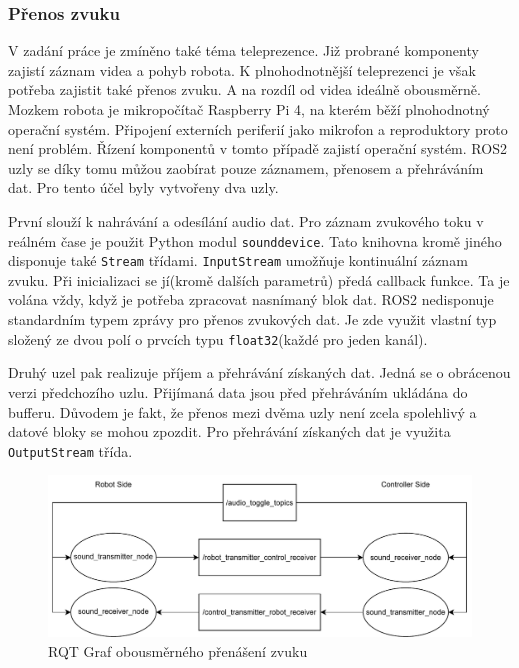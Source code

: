 \subsubsection*{Přenos zvuku}
V zadání práce je zmíněno také téma teleprezence. Již probrané komponenty zajistí záznam videa a pohyb robota. K plnohodnotnější teleprezenci je však potřeba zajistit také přenos zvuku. A na rozdíl od videa ideálně obousměrně. Mozkem robota je mikropočítač Raspberry Pi 4, na kterém běží plnohodnotný operační systém. Připojení externích periferií jako mikrofon a reproduktory proto není problém. Řízení komponentů v tomto případě zajistí operační systém. ROS2 uzly se díky tomu můžou zaobírat pouze záznamem, přenosem a přehráváním dat. Pro tento účel byly vytvořeny dva uzly.

První slouží k nahrávání a odesílání audio dat. Pro záznam zvukového toku v reálném čase je použit Python modul \verb|sounddevice|. Tato knihovna kromě jiného disponuje také \verb|Stream| třídami. \verb|InputStream| umožňuje kontinuální záznam zvuku. Při inicializaci se jí(kromě dalších parametrů) předá callback funkce. Ta je volána vždy, když je potřeba zpracovat nasnímaný blok dat. ROS2 nedisponuje standardním typem zprávy pro přenos zvukových dat. Je zde využit vlastní typ složený ze dvou polí o prvcích typu \verb|float32|(každé pro jeden kanál).

Druhý uzel pak realizuje příjem a přehrávání získaných dat. Jedná se o obrácenou verzi předchozího uzlu. Přijímaná data jsou před přehráváním ukládána do bufferu. Důvodem je fakt, že přenos mezi dvěma uzly není zcela spolehlivý a datové bloky se mohou zpozdit. Pro přehrávání získaných dat je využita \verb|OutputStream| třída.

\begin{figure}[h!]
	\centering
	\includegraphics[scale=0.75]{obrazky-figures/audio_transfer_diagram.pdf}
	\caption{RQT Graf obousměrného přenášení zvuku}
	\label{fig:rqt_sound}
\end{figure}

